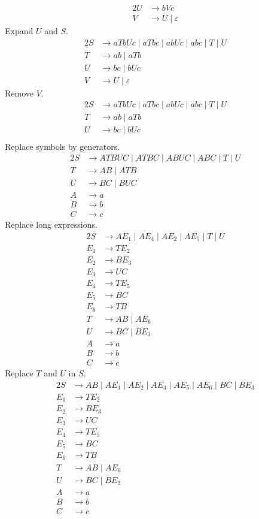 {\begin{alignat*}{2}
	U &\rightarrow bVc\\
	V &\rightarrow U\;|\;\varepsilon
\end{alignat*}
Expand $U$ and $S$.
\begin{alignat*}{2}
	S &\rightarrow aTbUc\;|\;aTbc\;|\;abUc\;|\;abc\;|\;T\;|\;U\\
	T &\rightarrow ab\;|\;aTb\\
	U &\rightarrow bc\;|\;bUc\\
	V &\rightarrow U\;|\;\varepsilon
\end{alignat*}
Remove $V$.
\begin{alignat*}{2}
	S &\rightarrow aTbUc\;|\;aTbc\;|\;abUc\;|\;abc\;|\;T\;|\;U\\
	T &\rightarrow ab\;|\;aTb\\
	U &\rightarrow bc\;|\;bUc\\
\end{alignat*}
Replace symbols by generators.
\begin{alignat*}{2}
	S &\rightarrow ATBUC\;|\;ATBC\;|\;ABUC\;|\;ABC\;|\;T\;|\;U\\
	T &\rightarrow AB\;|\;ATB\\
	U &\rightarrow BC\;|\;BUC\\
	A &\rightarrow a\\
	B &\rightarrow b\\
	C &\rightarrow c
\end{alignat*}
Replace long expressions.
\begin{alignat*}{2}
	S   &\rightarrow AE_1\;|\;AE_4\;|\;AE_2\;|\;AE_5\;|\;T\;|\;U\\
	E_1 &\rightarrow TE_2\\
	E_2 &\rightarrow BE_3\\
	E_3 &\rightarrow UC\\
	E_4 &\rightarrow TE_5\\
	E_5 &\rightarrow BC\\
	E_6 &\rightarrow TB\\
	T   &\rightarrow AB\;|\;AE_6\\
	U   &\rightarrow BC\;|\;BE_3\\
	A   &\rightarrow a\\
	B   &\rightarrow b\\
	C   &\rightarrow c
\end{alignat*}
Replace $T$ and $U$ in $S$.
\begin{alignat*}{2}
	S   &\rightarrow AB\;|\;AE_1\;|\;AE_2\;|\;AE_4\;|\;AE_5\;|\;AE_6\;|\;BC\;|\;BE_3\\
	E_1 &\rightarrow TE_2\\
	E_2 &\rightarrow BE_3\\
	E_3 &\rightarrow UC\\
	E_4 &\rightarrow TE_5\\
	E_5 &\rightarrow BC\\
	E_6 &\rightarrow TB\\
	T   &\rightarrow AB\;|\;AE_6\\
	U   &\rightarrow BC\;|\;BE_3\\
	A   &\rightarrow a\\
	B   &\rightarrow b\\
	C   &\rightarrow c
\end{alignat*}
}
